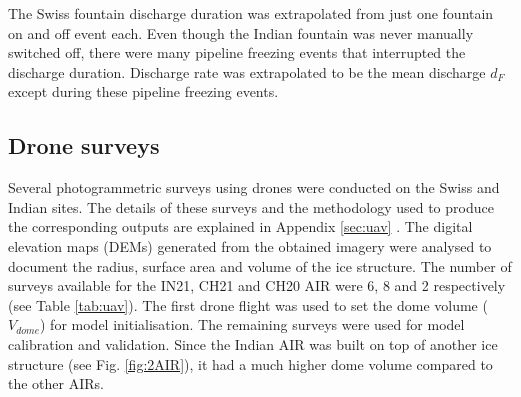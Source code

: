 \documentclass[utf8]{frontiersSCNS}
\begin{document}
The Swiss fountain discharge duration was extrapolated from just one fountain on and off event each. Even though
the Indian fountain was never manually switched off, there were many pipeline freezing events that interrupted
the discharge duration. Discharge rate was extrapolated to be the mean discharge $d_F$ except during these
pipeline freezing events.

\subsection{Drone surveys}

Several photogrammetric surveys using drones were conducted on the Swiss and Indian sites. The details of these
surveys and the methodology used to produce the corresponding outputs are explained in Appendix \ref{sec:uav} .
The digital elevation maps (DEMs) generated from the obtained imagery were analysed to document the radius,
surface area and volume of the ice structure. The number of surveys available for the IN21, CH21 and CH20 AIR
were 6, 8 and 2 respectively (see Table \ref{tab:uav}). The first drone flight was used to set the dome volume
($V_{dome}$) for model initialisation. The remaining surveys were used for model calibration and validation.
Since the Indian AIR was built on top of another ice structure (see Fig. \ref{fig:2AIR}), it had a much higher
dome volume compared to the other AIRs.  
\end{document}
